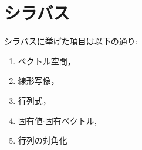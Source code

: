 




\section{シラバス}
シラバスに挙げた項目は以下の通り:
\begin{enumerate}
\item
  ベクトル空間，
\item 線形写像，
\item 行列式，
\item 固有値$\cdot$固有ベクトル,
\item 行列の対角化
\end{enumerate}

